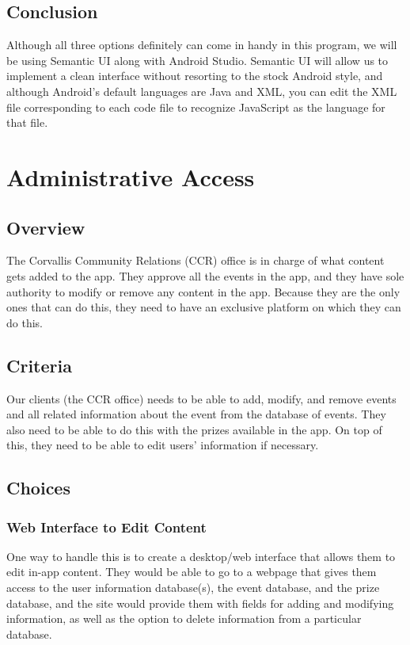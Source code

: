 \documentclass[draftclsnofoot, onecolumn, 10pt, compsoc]{IEEEtran}
\begin{document}
		\subsection{Conclusion}
			Although all three options definitely can come in handy in this program, we will be using Semantic UI along with Android Studio. Semantic UI will allow us to implement a clean interface without resorting to the stock Android style, and although Android's default languages are Java and XML, you can edit the XML file corresponding to each code file to recognize JavaScript as the language for that file.
			~\cite{SemanticUI_JS}
		
	\section{Administrative Access}
		\subsection{Overview}
			The Corvallis Community Relations (CCR) office is in charge of what content gets added to the app. They approve all the events in the app, and they have sole authority to modify or remove any content in the app. Because they are the only ones that can do this, they need to have an exclusive platform on which they can do this.
		\subsection{Criteria}
			Our clients (the CCR office) needs to be able to add, modify, and remove events and all related information about the event from the database of events. They also need to be able to do this with the prizes available in the app. On top of this, they need to be able to edit users' information if necessary.
		
		\subsection{Choices}
			\subsubsection{\textbf{Web Interface to Edit Content}}
				One way to handle this is to create a desktop/web interface that allows them to edit in-app content. They would be able to go to a webpage that gives them access to the user information database(s), the event database, and the prize database, and the site would provide them with fields for adding and modifying information, as well as the option to delete information from a particular database.
\end{document}

